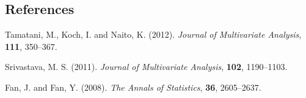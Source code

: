 \documentclass[12pt]{article}
\begin{document}
%        
%
%        

\subsection*{References}

\begin{description}

\item
Tamatani, M., Koch, I. and Naito, K. (2012).
\textit{Journal of Multivariate Analysis},
\textbf{111}, 350--367.

\item
Srivastava, M. S. (2011).
\textit{Journal of Multivariate Analysis},
\textbf{102}, 1190--1103.

\item
Fan, J. and Fan, Y. (2008).
\textit{The Annals of Statistics},
\textbf{36}, 2605--2637.


\end{description}
\end{document}
